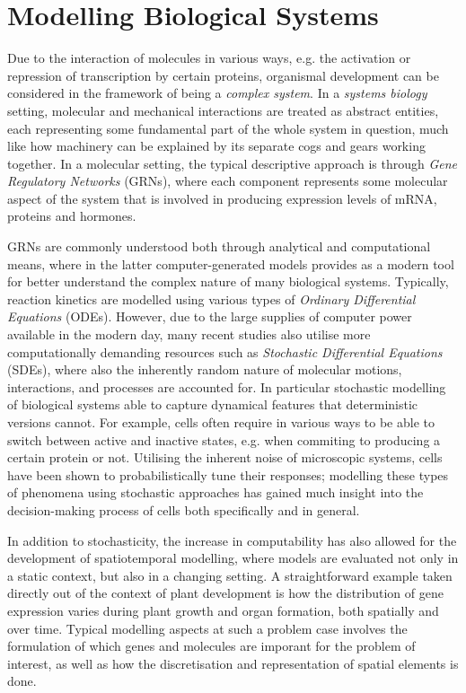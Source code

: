 
\section{Modelling Biological Systems} %
Due to the interaction of molecules in various ways, e.g. the activation or
repression of transcription by certain proteins, organismal development can be
considered in the framework of being a \textit{complex system}. In a
\textit{systems biology} setting, molecular and mechanical interactions are
treated as abstract entities, each representing some fundamental part of the
whole system in question, much like how machinery can be explained by its
separate cogs and gears working together. In a molecular setting, the typical
descriptive approach is through \textit{Gene Regulatory Networks} (GRNs), where
each component represents some molecular aspect of the system that is involved in
producing expression levels of mRNA, proteins and hormones. \CITE

GRNs are commonly understood both through analytical and computational means,
where in the latter computer-generated models provides as a modern tool for
better understand the complex nature of many biological systems. Typically,
reaction kinetics are modelled using various types of \textit{Ordinary
  Differential Equations} (ODEs). However, due to the large supplies of computer
power available in the modern day, many recent studies also utilise more
computationally demanding resources such as \textit{Stochastic Differential
  Equations} (SDEs), where also the inherently random nature of molecular
motions, interactions, and processes are accounted for. In particular stochastic
modelling of biological systems able to capture dynamical features that
deterministic versions cannot. For example, cells often require in various ways to be
able to switch between active and inactive states, e.g. when commiting to
producing a certain protein or not. Utilising the inherent noise of microscopic
systems, cells have been shown to probabilistically tune their responses; \CITE 
modelling these types of phenomena using stochastic approaches has gained much
insight into the decision-making process of cells both specifically and in
general. \CITE 

In addition to stochasticity, the increase in computability has also allowed for the development of
spatiotemporal modelling,   where models are evaluated not only in a static
context, but also in a changing  
setting. A straightforward example taken directly out of the context of plant
development is how the distribution of gene expression varies during plant
growth and organ formation, both spatially and over time. Typical modelling
aspects at such a problem case involves the formulation of which genes and
molecules are imporant for the problem of interest, as well as how the
discretisation and representation of spatial elements is done. \CITE

